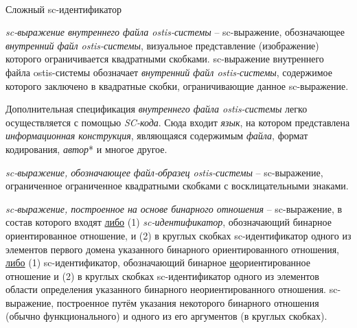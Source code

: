 \begin{frame}{\\Сложный sc-идентификатор}
	\topline
	\justifying
	\vspace*{\fill}\\
	\scriptsize
		\begin{textitemize}
			\item \textit{sc-выражение внутреннего файла ostis-системы} -- sc-выражение, обозначающее \textit{внутренний файл ostis-системы}, визуальное представление (изображение) которого ограничивается квадратными скобками. sc-выражение внутреннего файла ostis-системы обозначает \textit{внутренний файл ostis-системы}, содержимое которого заключено в квадратные скобки, ограничивающие данное sc-выражение.
				
			Дополнительная спецификация \textit{внутреннего файла ostis-системы} легко осуществляется с помощью \textit{SC-кода}. Сюда входит \textit{язык}, на котором представлена \textit{информационная конструкция}, являющаяся содержимым \textit{файла}, формат кодирования, \textit{автор}* и многое другое.
			
			\item \textit{sc-выражение, обозначающее файл-образец ostis-системы} -- sc-выражение, ограниченное ограниченное квадратными скобками с восклицательными знаками.
			
			\item \textit{sc-выражение, построенное на основе бинарного отношения} -- sc-выражение, в состав которого входят \underline{либо} (1) \textit{sc-идентификатор}, обозначающий бинарное ориентированное отношение, и (2) в круглых скобках sc-идентификатор одного из элементов первого домена указанного бинарного ориентированного отношения, \underline{либо} (1) sc-идентификатор, обозначающий бинарное \underline{не}ориентированное отношение и (2) в круглых скобках sc-идентификатор одного из элементов области определения указанного бинарного неориентированного отношения. sc-выражение, построенное путём указания некоторого бинарного отношения (обычно функционального) и одного из его аргументов (в круглых скобках).
		\end{textitemize}	
\end{frame}

